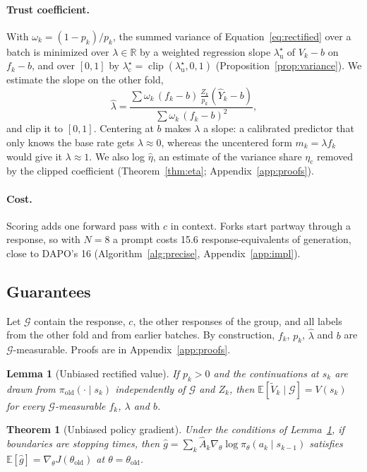 \documentclass[11pt]{article}
\newcommand{\Vt}{\tilde V}
\newcommand{\Ah}{\hat A}
\newcommand{\Yh}{\hat Y}
\newcommand{\piold}{\pi_{\mathrm{old}}}
\newcommand{\E}{\mathbb{E}}
\newcommand{\G}{\mathcal{G}}
\newcommand{\clip}{\operatorname{clip}}
\newcommand{\lamu}{\lambda^\star_{\mathrm u}}
\newcommand{\lamc}{\lambda^\star_{\mathrm c}}
\newcommand{\etac}{\eta_{\mathrm c}}
\newtheorem{lemma}{Lemma}
\newtheorem{theorem}{Theorem}
\theoremstyle{remark}
\begin{document}
\paragraph{Trust coefficient.}
With $\omega_k=(1-p_k)/p_k$, the summed variance of Equation~\eqref{eq:rectified} over a batch is minimized over $\lambda\in\mathbb{R}$ by a weighted regression slope $\lamu$ of $V_k-b$ on $f_k-b$, and over $[0,1]$ by $\lamc=\clip(\lamu,0,1)$ (Proposition~\ref{prop:variance}). We estimate the slope on the other fold,
\begin{equation}
\hat\lambda = \frac{\sum \omega_k\,(f_k-b)\,\frac{Z_k}{p_k}(\Yh_k - b)}{\sum \omega_k\,(f_k-b)^2},
\label{eq:lambda}
\end{equation}
and clip it to $[0,1]$. Centering at $b$ makes $\lambda$ a slope: a calibrated predictor that only knows the base rate gets $\lambda\approx0$, whereas the uncentered form $m_k=\lambda f_k$ would give it $\lambda\approx1$. We also log $\hat\eta$, an estimate of the variance share $\etac$ removed by the clipped coefficient (Theorem~\ref{thm:eta}; Appendix~\ref{app:proofs}).

\paragraph{Cost.}
Scoring adds one forward pass with $c$ in context. Forks start partway through a response, so with $N=8$ a prompt costs 15.6 response-equivalents of generation, close to DAPO's 16 (Algorithm~\ref{alg:precise}, Appendix~\ref{app:impl}).

\subsection{Guarantees}
\label{sec:guarantees}

Let $\G$ contain the response, $c$, the other responses of the group, and all labels from the other fold and from earlier batches. By construction, $f_k$, $p_k$, $\hat\lambda$ and $b$ are $\G$-measurable. Proofs are in Appendix~\ref{app:proofs}.

\begin{lemma}[Unbiased rectified value]\label{lem:unbiased}
If $p_k>0$ and the continuations at $s_k$ are drawn from $\piold(\cdot\mid s_k)$ independently of $\G$ and $Z_k$, then $\E[\Vt_k\mid\G]=V(s_k)$ for every $\G$-measurable $f_k$, $\lambda$ and $b$.
\end{lemma}

\begin{theorem}[Unbiased policy gradient]\label{thm:grad}
Under the conditions of Lemma~\ref{lem:unbiased}, if boundaries are stopping times, then $\hat g=\sum_k\Ah_k\nabla_\theta\log\pi_\theta(a_k\mid s_{k-1})$ satisfies $\E[\hat g]=\nabla_\theta J(\theta_{\mathrm{old}})$ at $\theta=\theta_{\mathrm{old}}$.
\end{theorem}
\end{document}
